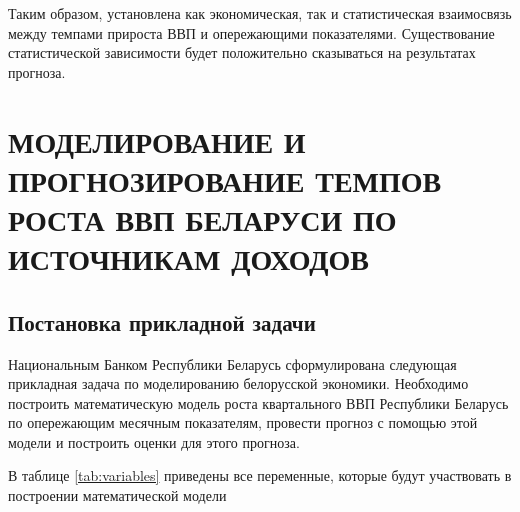 \documentclass[a4paper, 14pt]{extreport}
\numberwithin{equation}{section}
\numberwithin{equation}{section}
\begin{document}
	Таким образом, установлена как экономическая, так и статистическая взаимосвязь между темпами прироста ВВП и опережающими показателями. Существование статистической зависимости будет положительно сказываться на результатах прогноза.
	
	\newpage
	
	\chapter{МОДЕЛИРОВАНИЕ И ПРОГНОЗИРОВАНИЕ ТЕМПОВ РОСТА ВВП БЕЛАРУСИ ПО ИСТОЧНИКАМ ДОХОДОВ}
	\section{Постановка прикладной задачи}
	Национальным Банком Республики Беларусь сформулирована следующая прикладная задача по моделированию белорусской экономики. Необходимо построить математическую модель роста квартального ВВП Республики Беларусь по опережающим месячным показателям, провести прогноз с помощью этой модели и построить оценки для этого прогноза. 
	
	В таблице \ref{tab:variables} приведены все переменные, которые будут участвовать в построении математической модели
	
\end{document}

